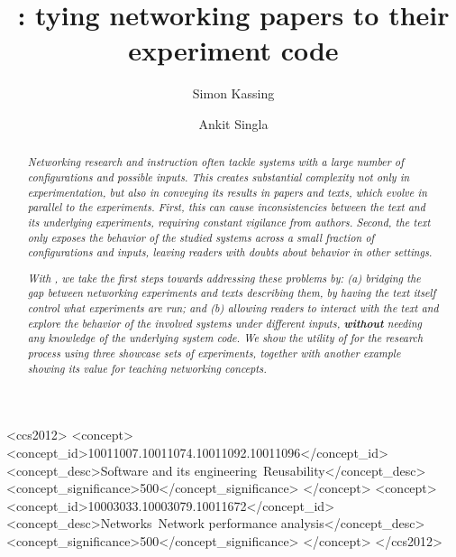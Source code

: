 \documentclass[sigconf]{acmart}
\begin{document}
\title{\sysname: tying networking papers to their experiment code}


\author{Simon Kassing}

\author{Ankit Singla}

\begin{abstract}
\textit{Networking research and instruction often tackle systems with a large number of configurations and possible inputs. This creates substantial complexity not only in experimentation, but also in conveying its results in papers and texts, which evolve in parallel to the experiments. First, this can cause inconsistencies between the text and its underlying experiments, requiring constant vigilance from authors. Second, the text only exposes the behavior of the studied systems across a small fraction of configurations and inputs, leaving readers with doubts about behavior in other settings.}

\textit{With \sysname, we take the first steps towards addressing these problems by: (a) bridging the gap between networking experiments and texts describing them, by having the text itself control what experiments are run; and (b) allowing readers to interact with the text and explore the behavior of the involved systems under different inputs, \textbf{without} needing any knowledge of the underlying system code. We show the utility of \sysname for the research process using three showcase sets of experiments, together with another example showing its value for teaching networking concepts.}

\end{abstract}

\begin{CCSXML}
<ccs2012>
   <concept>
       <concept_id>10011007.10011074.10011092.10011096</concept_id>
       <concept_desc>Software and its engineering~Reusability</concept_desc>
       <concept_significance>500</concept_significance>
       </concept>
   <concept>
       <concept_id>10003033.10003079.10011672</concept_id>
       <concept_desc>Networks~Network performance analysis</concept_desc>
       <concept_significance>500</concept_significance>
       </concept>
 </ccs2012>
\end{CCSXML}
\end{document}
